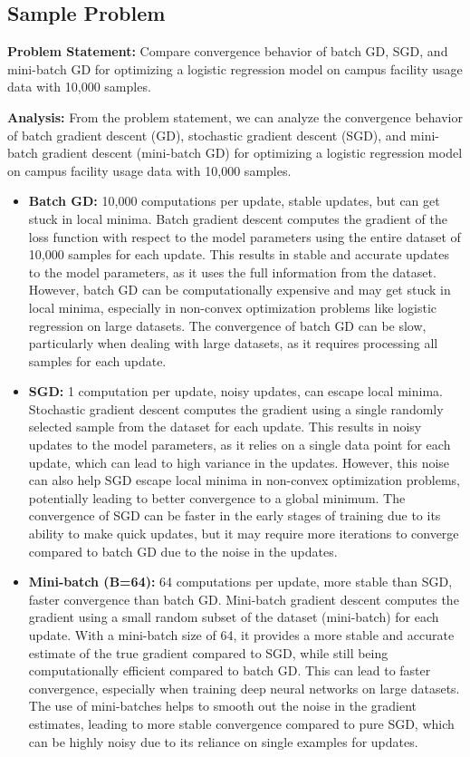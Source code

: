 \documentclass[
  letterpaper,
  DIV=11,
  numbers=noendperiod]{scrreprt}
\begin{document}
\subsection{Sample Problem}\label{sample-problem-21}

\textbf{Problem Statement:} Compare convergence behavior of batch GD,
SGD, and mini-batch GD for optimizing a logistic regression model on
campus facility usage data with 10,000 samples.

\textbf{Analysis:} From the problem statement, we can analyze the
convergence behavior of batch gradient descent (GD), stochastic gradient
descent (SGD), and mini-batch gradient descent (mini-batch GD) for
optimizing a logistic regression model on campus facility usage data
with 10,000 samples.

\begin{itemize}
\item
  \textbf{Batch GD:} 10,000 computations per update, stable updates, but
  can get stuck in local minima. Batch gradient descent computes the
  gradient of the loss function with respect to the model parameters
  using the entire dataset of 10,000 samples for each update. This
  results in stable and accurate updates to the model parameters, as it
  uses the full information from the dataset. However, batch GD can be
  computationally expensive and may get stuck in local minima,
  especially in non-convex optimization problems like logistic
  regression on large datasets. The convergence of batch GD can be slow,
  particularly when dealing with large datasets, as it requires
  processing all samples for each update.
\item
  \textbf{SGD:} 1 computation per update, noisy updates, can escape
  local minima. Stochastic gradient descent computes the gradient using
  a single randomly selected sample from the dataset for each update.
  This results in noisy updates to the model parameters, as it relies on
  a single data point for each update, which can lead to high variance
  in the updates. However, this noise can also help SGD escape local
  minima in non-convex optimization problems, potentially leading to
  better convergence to a global minimum. The convergence of SGD can be
  faster in the early stages of training due to its ability to make
  quick updates, but it may require more iterations to converge compared
  to batch GD due to the noise in the updates.
\item
  \textbf{Mini-batch (B=64):} 64 computations per update, more stable
  than SGD, faster convergence than batch GD. Mini-batch gradient
  descent computes the gradient using a small random subset of the
  dataset (mini-batch) for each update. With a mini-batch size of 64, it
  provides a more stable and accurate estimate of the true gradient
  compared to SGD, while still being computationally efficient compared
  to batch GD. This can lead to faster convergence, especially when
  training deep neural networks on large datasets. The use of
  mini-batches helps to smooth out the noise in the gradient estimates,
  leading to more stable convergence compared to pure SGD, which can be
  highly noisy due to its reliance on single examples for updates.
\end{itemize}
\end{document}
